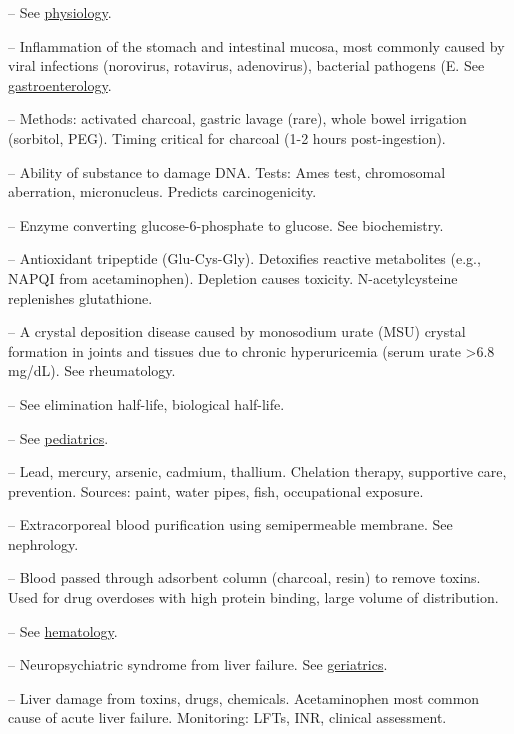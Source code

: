 -- See \hyperlink{Physiology}{physiology}.

-- Inflammation of the stomach and intestinal mucosa, most commonly caused by viral infections (norovirus, rotavirus, adenovirus), bacterial pathogens (E. See \hyperlink{Gastroenterology}{gastroenterology}.

-- Methods: activated charcoal, gastric lavage (rare), whole bowel irrigation (sorbitol, PEG). Timing critical for charcoal (1-2 hours post-ingestion).

-- Ability of substance to damage DNA. Tests: Ames test, chromosomal aberration, micronucleus. Predicts carcinogenicity.

-- Enzyme converting glucose-6-phosphate to glucose. See biochemistry.

-- Antioxidant tripeptide (Glu-Cys-Gly). Detoxifies reactive metabolites (e.g., NAPQI from acetaminophen). Depletion causes toxicity. N-acetylcysteine replenishes glutathione.

-- A crystal deposition disease caused by monosodium urate (MSU) crystal formation in joints and tissues due to chronic hyperuricemia (serum urate >6.8 mg/dL). See rheumatology.

-- See elimination half-life, biological half-life.

-- See \hyperlink{Pediatrics}{pediatrics}.

-- Lead, mercury, arsenic, cadmium, thallium. Chelation therapy, supportive care, prevention. Sources: paint, water pipes, fish, occupational exposure.

-- Extracorporeal blood purification using semipermeable membrane. See nephrology.

-- Blood passed through adsorbent column (charcoal, resin) to remove toxins. Used for drug overdoses with high protein binding, large volume of distribution.

-- See \hyperlink{hematology}{hematology}.

-- Neuropsychiatric syndrome from liver failure. See \hyperlink{Geriatrics}{geriatrics}.

-- Liver damage from toxins, drugs, chemicals. Acetaminophen most common cause of acute liver failure. Monitoring: LFTs, INR, clinical assessment.

